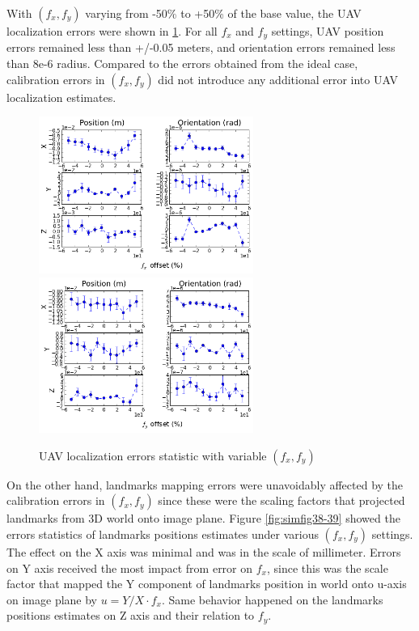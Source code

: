 With $(f_x, f_y)$ varying from -50\% to +50\% of the base value, the
UAV localization errors were shown in \ref{fig:simfig43-44}. For all
$f_x$ and $f_y$ settings, UAV position errors remained less than
+/-0.05 meters, and orientation errors remained less than 8e-6 radius.
Compared to the errors obtained from the ideal case, calibration
errors in $(f_x, f_y)$ did not introduce any additional error into UAV
localization estimates.
\begin{figure}[h]
  \centering
  \includegraphics[width=7cm,keepaspectratio=true]{./Figures/SimulationFigures/Figure43.png}
  \includegraphics[width=7cm,keepaspectratio=true]{./Figures/SimulationFigures/Figure44.png}
  \caption{UAV localization errors statistic with variable $(f_x, f_y)$}
  \label{fig:simfig43-44}
\end{figure}

On the other hand, landmarks mapping errors were unavoidably affected
by the calibration errors in $(f_x, f_y)$ since these were the scaling
factors that projected landmarks from 3D world onto image plane.
Figure \ref{fig:simfig38-39} showed the errors statistics of landmarks
positions estimates under various $(f_x, f_y)$ settings. The effect on
the X axis was minimal and was in the scale of millimeter. Errors on Y
axis received the most impact from error on $f_x$, since this was the
scale factor that mapped the Y component of landmarks position in
world onto u-axis on image plane by $u = Y/X \cdot f_x$. Same behavior
happened on the landmarks positions estimates on Z axis and their
relation to $f_y$.

